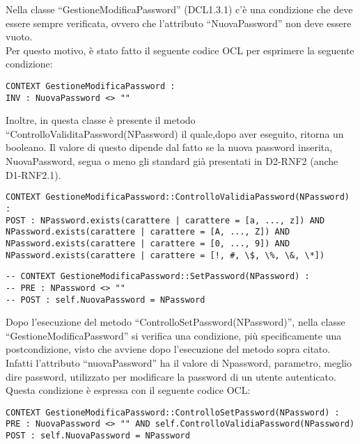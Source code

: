 \begin{listaPersonale}[OCL]{}
    Nella classe “GestioneModificaPassword” (DCL1.3.1) c’è una condizione che deve essere sempre verificata, ovvero che l’attributo “NuovaPassword” non deve essere vuoto. \\
    Per questo motivo, è stato fatto il seguente codice OCL per esprimere la seguente condizione:
    \begin{lstlisting}
CONTEXT GestioneModificaPassword :
INV : NuovaPassword <> ""
    \end{lstlisting}
    Inoltre, in questa classe è presente il metodo “ControlloValiditaPassword(NPassword) il quale,dopo aver eseguito, ritorna un booleano. Il valore di questo dipende dal fatto se la nuova password inserita, NuovaPassword, segua o meno gli standard già presentati in D2-RNF2 (anche D1-RNF2.1). 
    \begin{lstlisting}
CONTEXT GestioneModificaPassword::ControlloValidiaPassword(NPassword) :
POST : NPassword.exists(carattere | carattere = [a, ..., z]) AND NPassword.exists(carattere | carattere = [A, ..., Z]) AND NPassword.exists(carattere | carattere = [0, ..., 9]) AND NPassword.exists(carattere | carattere = [!, #, \$, \%, \&, \*]) 
    \end{lstlisting}

    \begin{lstlisting}
-- CONTEXT GestioneModificaPassword::SetPassword(NPassword) :
-- PRE : NPassword <> ""
-- POST : self.NuovaPassword = NPassword
    \end{lstlisting}
    Dopo l’esecuzione del metodo “ControlloSetPassword(NPassword)”, nella classe “GestioneModificaPassword” si verifica una condizione, più specificamente una postcondizione, visto che avviene dopo l’esecuzione del metodo sopra citato. Infatti l’attributo “nuovaPassword” ha il valore di Npassword, parametro, meglio dire password, utilizzato per modificare la password di un utente autenticato.\\
    Questa condizione è espressa con il seguente codice OCL:
    \begin{lstlisting}
CONTEXT GestioneModificaPassword::ControlloSetPassword(NPassword) :
PRE : NuovaPassword <> "" AND self.ControlloValidiaPassword(NPassword)
POST : self.NuovaPassword = NPassword
    \end{lstlisting}





\end{listaPersonale}
